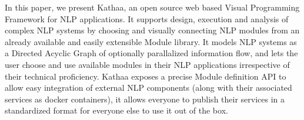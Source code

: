 In this paper, we present Kathaa, an open source web based Visual Programming Framework for NLP applications. It supports design, execution and analysis of complex NLP systems by choosing and visually connecting NLP modules from an already available and easily extensible Module library. It models NLP systems as a Directed Acyclic Graph of optionally parallalized information flow, and lets the user choose and use available modules in their NLP applications irrespective of their technical proficiency. Kathaa exposes a precise Module definition API to allow easy integration of external NLP components (along with their associated services as docker containers), it allows everyone to publish their services in a standardized format for everyone else to use it out of the box.
